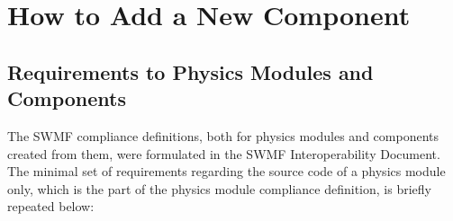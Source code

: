 

\chapter{How to Add a New Component}

\section{Requirements to Physics Modules and Components}

The SWMF compliance definitions, both for physics modules and components created from 
them, were formulated in the SWMF Interoperability Document. 
The  minimal set of requirements regarding the source code of a physics module only,
which is the part of the physics module compliance definition, 
is briefly repeated below:

